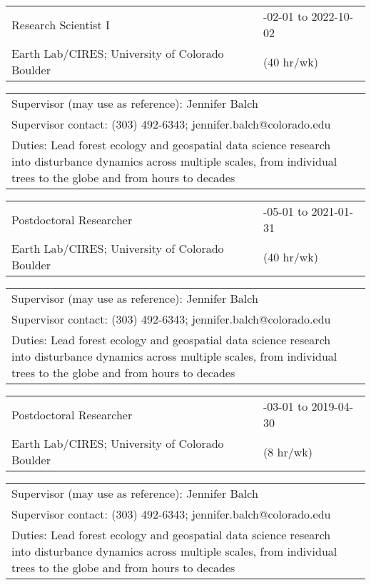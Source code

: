 \documentclass[10pt,english]{article}
\providecommand{\tabularnewline}{\\}
\begin{document}
\renewcommand{\arraystretch}{1.2}
\begin{tabularx}{\textwidth}{@{}>{\raggedright}p{4.5in} >{\raggedleft}X@{}}
Research Scientist I & 2021-02-01 to 2022-10-02 \tabularnewline
Earth Lab/CIRES; University of Colorado Boulder & (40 hr/wk) \tabularnewline
\end{tabularx}

\renewcommand{\arraystretch}{1.2}
\begin{tabularx}{\textwidth}{@{}>{\raggedright}p{6.25in} >{\raggedleft}X@{}}
\addtolength{\leftskip}{5ex}Supervisor (may use as reference): Jennifer Balch \tabularnewline
\addtolength{\leftskip}{5ex}Supervisor contact: (303) 492-6343; jennifer.balch@colorado.edu \tabularnewline
\addtolength{\leftskip}{5ex}Duties: Lead forest ecology and geospatial data science research into disturbance dynamics across multiple scales, from individual trees to the globe and from hours to decades  \tabularnewline
\end{tabularx}

\renewcommand{\arraystretch}{1.2}
\begin{tabularx}{\textwidth}{@{}>{\raggedright}p{4.5in} >{\raggedleft}X@{}}
Postdoctoral Researcher & 2019-05-01 to 2021-01-31 \tabularnewline
Earth Lab/CIRES; University of Colorado Boulder & (40 hr/wk) \tabularnewline
\end{tabularx}

\renewcommand{\arraystretch}{1.2}
\begin{tabularx}{\textwidth}{@{}>{\raggedright}p{6.25in} >{\raggedleft}X@{}}
\addtolength{\leftskip}{5ex}Supervisor (may use as reference): Jennifer Balch \tabularnewline
\addtolength{\leftskip}{5ex}Supervisor contact: (303) 492-6343; jennifer.balch@colorado.edu \tabularnewline
\addtolength{\leftskip}{5ex}Duties: Lead forest ecology and geospatial data science research into disturbance dynamics across multiple scales, from individual trees to the globe and from hours to decades \tabularnewline
\end{tabularx}

\renewcommand{\arraystretch}{1.2}
\begin{tabularx}{\textwidth}{@{}>{\raggedright}p{4.5in} >{\raggedleft}X@{}}
Postdoctoral Researcher & 2019-03-01 to 2019-04-30 \tabularnewline
Earth Lab/CIRES; University of Colorado Boulder & (8 hr/wk) \tabularnewline
\end{tabularx}

\renewcommand{\arraystretch}{1.2}
\begin{tabularx}{\textwidth}{@{}>{\raggedright}p{6.25in} >{\raggedleft}X@{}}
\addtolength{\leftskip}{5ex}Supervisor (may use as reference): Jennifer Balch \tabularnewline
\addtolength{\leftskip}{5ex}Supervisor contact: (303) 492-6343; jennifer.balch@colorado.edu \tabularnewline
\addtolength{\leftskip}{5ex}Duties: Lead forest ecology and geospatial data science research into disturbance dynamics across multiple scales, from individual trees to the globe and from hours to decades \tabularnewline
\end{tabularx}
\end{document}

